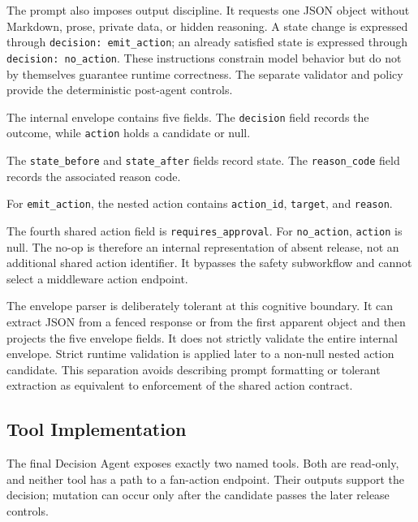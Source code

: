 The prompt also imposes output discipline. It requests one JSON object without
Markdown, prose, private data, or hidden reasoning. A state change is expressed
through \texttt{decision: emit\_action}; an already satisfied state is
expressed through \texttt{decision: no\_action}. These instructions constrain
model behavior but do not by themselves guarantee runtime correctness. The
separate validator and policy provide the deterministic post-agent controls.

The internal envelope contains five fields. The \texttt{decision} field records
the outcome, while \texttt{action} holds a candidate or null.

The {\small\texttt{state\_before}} and {\small\texttt{state\_after}} fields
record state. The {\small\texttt{reason\_code}} field records the associated
reason code.

For \texttt{emit\_action}, the nested action contains \texttt{action\_id},
\texttt{target}, and \texttt{reason}.

The fourth shared action field is \texttt{requires\_approval}. For
\texttt{no\_action}, \texttt{action} is null. The no-op is therefore an
internal representation of absent release, not an additional shared action
identifier. It bypasses the safety subworkflow and cannot select a middleware
action endpoint.

The envelope parser is deliberately tolerant at this cognitive boundary. It
can extract JSON from a fenced response or from the first apparent object and
then projects the five envelope fields. It does not strictly validate the
entire internal envelope. Strict runtime validation is applied later to a
non-null nested action candidate. This separation avoids describing prompt
formatting or tolerant extraction as equivalent to enforcement of the shared
action contract.

\subsection{Tool Implementation}\label{subsec:impl-tools}

The final Decision Agent exposes exactly two named tools. Both are read-only,
and neither tool has a path to a fan-action endpoint. Their outputs support
the decision; mutation can occur only after the candidate passes the later
release controls.


